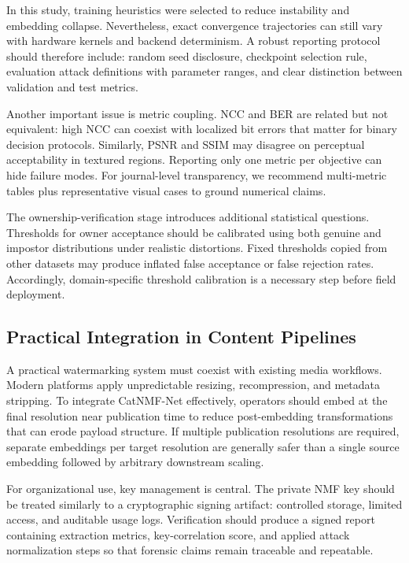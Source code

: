 \documentclass[journal]{IEEEtran}
\begin{document}
In this study, training heuristics were selected to reduce instability and
embedding collapse. Nevertheless, exact convergence trajectories can still vary
with hardware kernels and backend determinism. A robust reporting protocol
should therefore include: random seed disclosure, checkpoint selection rule,
evaluation attack definitions with parameter ranges, and clear distinction
between validation and test metrics.

Another important issue is metric coupling. NCC and BER are related but not
equivalent: high NCC can coexist with localized bit errors that matter for
binary decision protocols. Similarly, PSNR and SSIM may disagree on perceptual
acceptability in textured regions. Reporting only one metric per objective can
hide failure modes. For journal-level transparency, we recommend multi-metric
tables plus representative visual cases to ground numerical claims.

The ownership-verification stage introduces additional statistical questions.
Thresholds for owner acceptance should be calibrated using both genuine and
impostor distributions under realistic distortions. Fixed thresholds copied from
other datasets may produce inflated false acceptance or false rejection rates.
Accordingly, domain-specific threshold calibration is a necessary step before
field deployment.

\subsection{Practical Integration in Content Pipelines}

A practical watermarking system must coexist with existing media workflows.
Modern platforms apply unpredictable resizing, recompression, and metadata
stripping. To integrate CatNMF-Net effectively, operators should embed at the
final resolution near publication time to reduce post-embedding transformations
that can erode payload structure. If multiple publication resolutions are
required, separate embeddings per target resolution are generally safer than a
single source embedding followed by arbitrary downstream scaling.

For organizational use, key management is central. The private NMF key should
be treated similarly to a cryptographic signing artifact: controlled storage,
limited access, and auditable usage logs. Verification should produce a signed
report containing extraction metrics, key-correlation score, and applied attack
normalization steps so that forensic claims remain traceable and repeatable.
\end{document}

